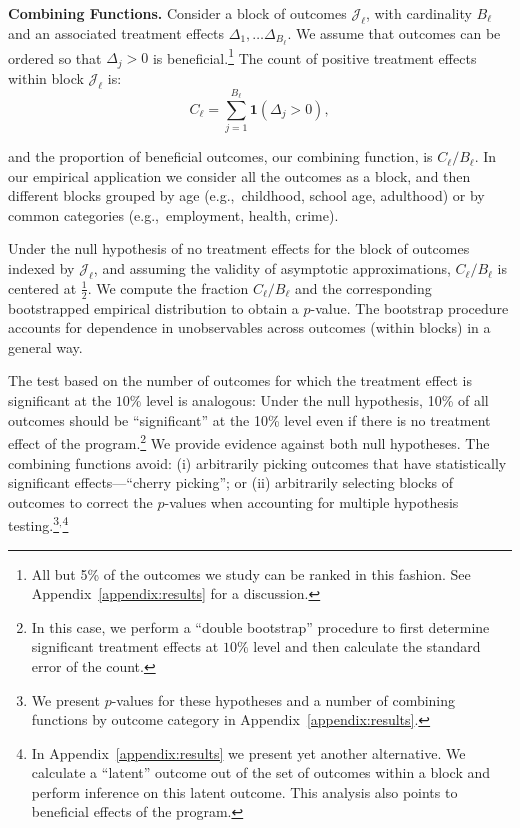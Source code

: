 \textbf{Combining Functions.} Consider a block of outcomes $\mathcal{J}_{\ell}$, with cardinality $B_{\ell}$ and an associated treatment effects $\Delta_1, \ldots \Delta_{B_\ell}$. We assume that outcomes can be ordered so that $\Delta_{j} >0$ is beneficial.\footnote{All but 5\% of the outcomes we study can be ranked in this fashion. See Appendix~\ref{appendix:results} for a discussion.} The count of positive treatment effects within block $\mathcal{J}_{\ell}$ is:
\begin{equation}
C_\ell = \sum^{B_\ell}_{j=1} \bm{1} (\Delta_{j} >0), 
\end{equation}

\noindent and the proportion of beneficial outcomes, our combining function, is $C_\ell / B_\ell$. In our empirical application we consider all the outcomes as a block, and then different blocks grouped by age (e.g.,\ childhood, school age, adulthood) or by common categories (e.g.,\ employment, health, crime).

Under the null hypothesis of no treatment effects for the block of outcomes indexed by $\mathcal{J}_\ell$, and assuming the validity of asymptotic approximations, $C_\ell / B_\ell$ is centered at $\frac{1}{2}$. We compute the fraction $C_\ell / B_\ell$ and the corresponding bootstrapped empirical distribution to obtain a $p$-value. The bootstrap procedure accounts for dependence in unobservables across outcomes (within blocks) in a general way. 

The test based on the number of outcomes for which the treatment effect is significant at the $10\%$ level is analogous: Under the null hypothesis, 10\% of all outcomes should be ``significant'' at the 10\% level even if there is no treatment effect of the program.\footnote{In this case, we perform a ``double bootstrap'' procedure to first determine significant treatment effects at $10\%$ level and then calculate the standard error of the count.} We provide evidence against both null hypotheses. The combining functions avoid: (i) arbitrarily picking outcomes that have statistically significant effects---``cherry picking''; or (ii) arbitrarily selecting blocks of outcomes to correct the $p$-values when accounting for multiple hypothesis testing.\footnote{We present $p$-values for these hypotheses and a number of combining functions by outcome category in Appendix~\ref{appendix:results}.}$^{\text{,}}$\footnote{In Appendix~\ref{appendix:results} we present yet another alternative. We calculate a ``latent'' outcome out of the set of outcomes within a block and perform inference on this latent outcome. This analysis also points to beneficial effects of the program.} 

